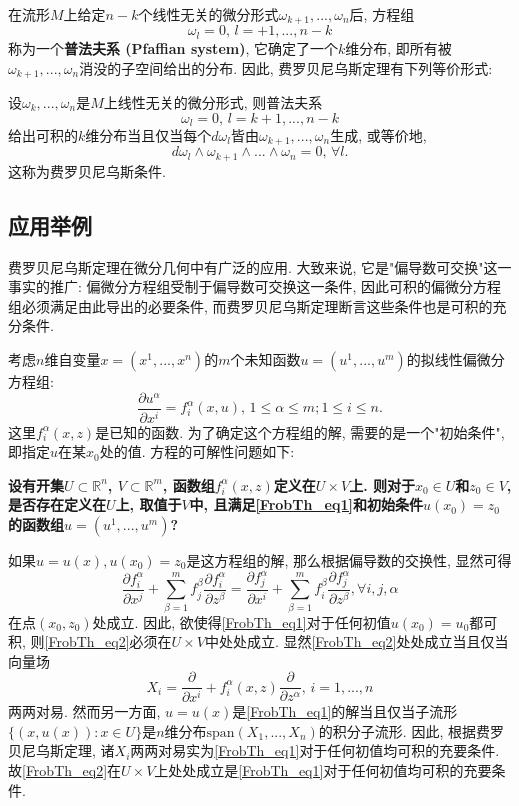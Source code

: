 在流形$M$上给定$n-k$个线性无关的微分形式$\omega_{k+1},...,\omega_{n}$后, 方程组
$$
\omega_{l}=0,\,l=+1,...,n-k
$$
称为一个\textbf{普法夫系 (Pfaffian system)}, 它确定了一个$k$维分布, 即所有被$\omega_{k+1},...,\omega_{n}$消没的子空间给出的分布. 因此, 费罗贝尼乌斯定理有下列等价形式:
\begin{theorem}{}
设$\omega_{k},...,\omega_{n}$是$M$上线性无关的微分形式, 则普法夫系
$$
\omega_{l}=0,\,l=k+1,...,n-k
$$
给出可积的$k$维分布当且仅当每个$d\omega_l$皆由$\omega_{k+1},...,\omega_{n}$生成, 或等价地,
$$
d\omega_{l}\wedge\omega_{k+1}\wedge...\wedge\omega_{n}=0,\,\forall l.
$$
这称为费罗贝尼乌斯条件.
\end{theorem}

\subsection{应用举例}
费罗贝尼乌斯定理在微分几何中有广泛的应用. 大致来说, 它是"偏导数可交换"这一事实的推广: 偏微分方程组受制于偏导数可交换这一条件, 因此可积的偏微分方程组必须满足由此导出的必要条件, 而费罗贝尼乌斯定理断言这些条件也是可积的充分条件.

考虑$n$维自变量$x=(x^1,...,x^n)$的$m$个未知函数$u=(u^1,...,u^m)$的拟线性偏微分方程组:
\begin{equation}\label{FrobTh_eq1}
\frac{\partial u^\alpha}{\partial x^i}=f_i^\alpha(x,u),\,1\leq\alpha\leq m;1\leq i\leq n.
\end{equation}
这里$f_i^\alpha(x,z)$是已知的函数. 为了确定这个方程组的解, 需要的是一个"初始条件", 即指定$u$在某$x_0$处的值. 方程的可解性问题如下:

\textbf{设有开集$U\subset\mathbb{R}^n$, $V\subset\mathbb{R}^m$, 函数组$f_i^\alpha(x,z)$定义在$U\times V$上. 则对于$x_0\in U$和$z_0\in V$, 是否存在定义在$U$上, 取值于$V$中, 且满足\autoref{FrobTh_eq1}和初始条件$u(x_0)=z_0$的函数组$u=(u^1,...,u^m)$?}

如果$u=u(x),u(x_0)=z_0$是这方程组的解, 那么根据偏导数的交换性, 显然可得
\begin{equation}\label{FrobTh_eq2}
\frac{\partial f_i^\alpha}{\partial x^j}+\sum_{\beta=1}^mf_j^\beta\frac{\partial f_i^\alpha}{\partial z^\beta}
=\frac{\partial f_j^\alpha}{\partial x^i}+\sum_{\beta=1}^mf_i^\beta\frac{\partial f_j^\alpha}{\partial z^\beta},\forall i,j,\alpha
\end{equation}
在点$(x_0,z_0)$处成立. 因此, 欲使得\autoref{FrobTh_eq1}对于任何初值$u(x_0)=u_0$都可积, 则\autoref{FrobTh_eq2}必须在$U\times V$中处处成立. 显然\autoref{FrobTh_eq2}处处成立当且仅当向量场
$$
X_i=\frac{\partial}{\partial x^i}+f_i^\alpha(x,z)\frac{\partial}{\partial z^\alpha},\,i=1,...,n
$$
两两对易. 然而另一方面, $u=u(x)$是\autoref{FrobTh_eq1}的解当且仅当子流形$\{(x,u(x)):x\in U\}$是$n$维分布$\text{span}(X_1,...,X_n)$的积分子流形. 因此, 根据费罗贝尼乌斯定理, 诸$X_i$两两对易实为\autoref{FrobTh_eq1}对于任何初值均可积的充要条件. 故\autoref{FrobTh_eq2}在$U\times V$上处处成立是\autoref{FrobTh_eq1}对于任何初值均可积的充要条件.